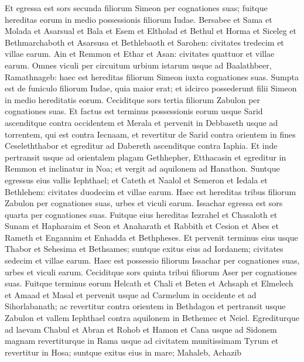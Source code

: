 \begin{biblechapter}  
\verse Et egressa est sors secunda filiorum Simeon per cognationes suas; fuitque hereditas 
\verse eorum in medio possessionis filiorum Iudae. Bersabee et Sama et Molada 
\verse et Asarsual et Bala et Esem 
\verse et Eltholad et Bethul et Horma 
\verse et Siceleg et Bethmarchaboth et Asarsusa 
\verse et Bethlebaoth et Sarohen: civitates tredecim et villae earum. 
\verse Ain et Remmon et Ethar et Asan: civitates quattuor et villae earum. 
\verse Omnes viculi per circuitum urbium istarum usque ad Baalathbeer, Ramathnageb: haec est hereditas filiorum Simeon iuxta cognationes suas. 
\verse Sumpta est de funiculo filiorum Iudae, quia maior erat; et idcirco possederunt filii Simeon in medio hereditatis eorum. 
\verse Ceciditque sors tertia filiorum Zabulon per cognationes suas. Et factus est terminus possessionis eorum usque Sarid 
\verse ascenditque contra occidentem et Merala et pervenit in Debbaseth usque ad torrentem, qui est contra Iecnaam,  
\verse et revertitur de Sarid contra orientem in fines Ceseleththabor et egreditur ad Dabereth ascenditque contra Iaphia. 
\verse Et inde pertransit usque ad orientalem plagam Gethhepher, Etthacasin et egreditur in Remmon et inclinatur in Noa; 
\verse et vergit ad aquilonem ad Hanathon. Suntque egressus eius vallis Iephthael; 
\verse et Cateth et Naalol et Semeron et Iedala et Bethlehem: civitates duodecim et villae earum. 
\verse Haec est hereditas tribus filiorum Zabulon per cognationes suas, urbes et viculi earum. 
\verse Issachar egressa est sors quarta per cognationes suas. 
\verse Fuitque eius hereditas Iezrahel et Chasaloth et Sunam 
\verse et Hapharaim et Seon et Anaharath 
\verse et Rabbith et Cesion et Abes 
\verse et Rameth et Engannim et Enhadda et Bethpheses. 
\verse Et pervenit terminus eius usque Thabor et Sehesima et Bethsames; suntque exitus eius ad Iordanem; civitates sedecim et villae earum. 
\verse Haec est possessio filiorum Issachar per cognationes suas, urbes et viculi earum. 
\verse Ceciditque sors quinta tribui filiorum Aser per cognationes suas. 
\verse Fuitque terminus eorum Helcath et Chali et Beten et Achsaph 
\verse et Elmelech et Amaad et Masal et pervenit usque ad Carmelum in occidente et ad Sihorlabanath; 
\verse ac revertitur contra orientem in Bethdagon et pertransit usque Zabulon et vallem Iephthael contra aquilonem in Bethemec et Neiel. Egrediturque ad laevam Chabul 
\verse et Abran et Rohob et Hamon et Cana usque ad Sidonem magnam 
\verse revertiturque in Rama usque ad civitatem munitissimam Tyrum et revertitur in Hosa; suntque exitus eius in mare; Mahaleb, Achazib 

\end{biblechapter}
